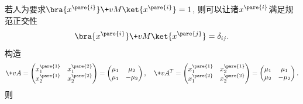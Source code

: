 \documentclass{ctexart}
\begin{document}
若人为要求$\bra{x^{\pare{i}}}\+vM \ket{x^{\pare{i}}} = 1$, 则可以让诸$x^{\pare{i}}$满足规范正交性
\[ \bra{x^{\pare{i}}}\+vM \ket{x^{\pare{j}}} = \delta_{ij}. \]
构造
\[ \+vA = \begin{pmatrix}
    x_1^{\pare{1}} & x_1^{\pare{2}} \\
    x_2^{\pare{1}} & x_2^{\pare{2}}
\end{pmatrix} = \begin{pmatrix}
    \mu_1 & \mu_2 \\
    \mu_1 & -\mu_2
\end{pmatrix},\quad \+vA^T = \begin{pmatrix}
    x_1^{\pare{1}} & x_2^{\pare{1}} \\
    x_1^{\pare{2}} & x_2^{\pare{2}}
\end{pmatrix} = \begin{pmatrix}
    \mu_1 & \mu_1 \\
    \mu_2 & -\mu_2
\end{pmatrix}. \]
则
\end{document}
